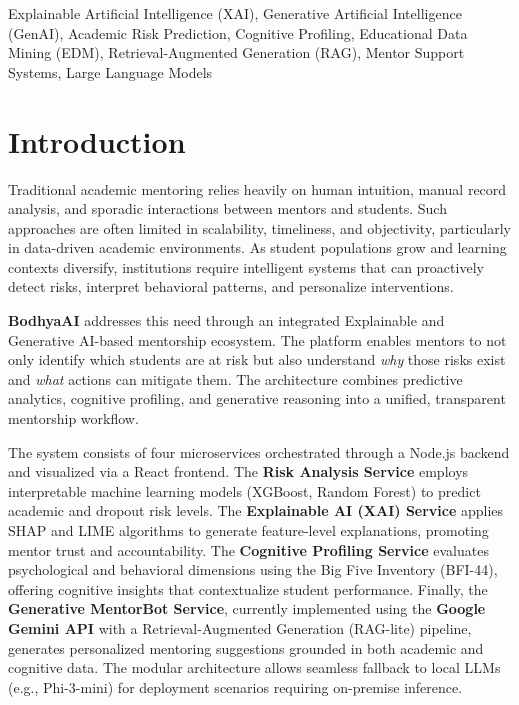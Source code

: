 \documentclass[conference]{IEEEtran}
\begin{document}
\begin{IEEEkeywords}
Explainable Artificial Intelligence (XAI), Generative Artificial Intelligence (GenAI), Academic Risk Prediction, Cognitive Profiling, Educational Data Mining (EDM), Retrieval-Augmented Generation (RAG), Mentor Support Systems, Large Language Models
\end{IEEEkeywords}


\section{Introduction}
Traditional academic mentoring relies heavily on human intuition, manual record analysis, and sporadic interactions between mentors and students. Such approaches are often limited in scalability, timeliness, and objectivity, particularly in data-driven academic environments. As student populations grow and learning contexts diversify, institutions require intelligent systems that can proactively detect risks, interpret behavioral patterns, and personalize interventions.  

\textbf{BodhyaAI} addresses this need through an integrated Explainable and Generative AI-based mentorship ecosystem. The platform enables mentors to not only identify which students are at risk but also understand \textit{why} those risks exist and \textit{what} actions can mitigate them. The architecture combines predictive analytics, cognitive profiling, and generative reasoning into a unified, transparent mentorship workflow.  

The system consists of four microservices orchestrated through a Node.js backend and visualized via a React frontend. The \textbf{Risk Analysis Service} employs interpretable machine learning models (XGBoost, Random Forest) to predict academic and dropout risk levels. The \textbf{Explainable AI (XAI) Service} applies SHAP and LIME algorithms to generate feature-level explanations, promoting mentor trust and accountability. The \textbf{Cognitive Profiling Service} evaluates psychological and behavioral dimensions using the Big Five Inventory (BFI-44), offering cognitive insights that contextualize student performance. Finally, the \textbf{Generative MentorBot Service}, currently implemented using the \textbf{Google Gemini API} with a Retrieval-Augmented Generation (RAG-lite) pipeline, generates personalized mentoring suggestions grounded in both academic and cognitive data. The modular architecture allows seamless fallback to local LLMs (e.g., Phi-3-mini) for deployment scenarios requiring on-premise inference.  
\end{document}
